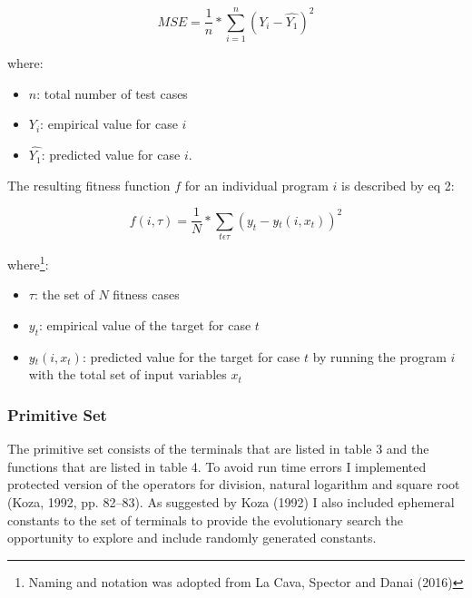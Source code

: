 \documentclass[
  12pt,
]{article}
\providecommand{\tightlist}{%
  \setlength{\itemsep}{0pt}\setlength{\parskip}{0pt}}
\begin{document}
\begin{equation}
\tag{eq. 1}
MSE = \frac{1}{n} * \sum_{i=1}^{n} (Y_i - \hat{Y_1})^2
\end{equation}

where:

\begin{itemize}
\tightlist
\item
  \(n\): total number of test cases
\item
  \(Y_i\): empirical value for case \(i\)
\item
  \(\hat{Y_1}\): predicted value for case \(i\).
\end{itemize}

The resulting fitness function \(f\) for an individual program \(i\) is
described by eq 2:

\begin{equation}
\tag{eq. 2}
 f(i, \tau ) = \frac{1}{N} * \sum_{t \epsilon \tau} (y_t - y\hat{}_t(i, x_t))^2 
\end{equation}

where\footnote{Naming and notation was adopted from La Cava, Spector and
  Danai (2016)}:

\begin{itemize}
\tightlist
\item
  \(\tau\): the set of \(N\) fitness cases
\item
  \(y_t\): empirical value of the target for case \(t\)
\item
  \(y\hat{}_t(i, x_t)\): predicted value for the target for case \(t\)
  by running the program \(i\) with the total set of input variables
  \(x_t\)
\end{itemize}

\hypertarget{primitive-set}{%
\subsubsection{Primitive Set}\label{primitive-set}}

The primitive set consists of the terminals that are listed in table 3
and the functions that are listed in table 4. To avoid run time errors I
implemented protected version of the operators for division, natural
logarithm and square root (Koza, 1992, pp. 82--83). As suggested by Koza
(1992) I also included ephemeral constants to the set of terminals to
provide the evolutionary search the opportunity to explore and include
randomly generated constants.
\end{document}
